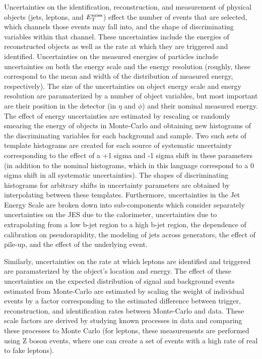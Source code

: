 Uncertainties on the identification, reconstruction, and measurement of physical objects (jets, leptons, and $E_{\mathrm{T}}^{\mathrm{miss}}$) effect the number of events that are selected, which channels those events may fall into, and the shape of discriminating variables within that channel.
These uncertainties include the energies of reconstructed objects as well as the rate at which they are triggered and identified.
Uncertainties on the measured energies of particles include uncertainties on both the energy scale and the energy resolution (roughly, these correspond to the mean and width of the distribution of measured energy, respectively).
The size of the uncertainties on object energy scale and energy resolution are paramaterized by a number of object variables, but most important are their position in the detector (in $\eta$ and $\phi$) and their nominal measured energy.
The effect of energy uncertainties are estimated by rescaling or randomly smearing the energy of objects in Monte-Carlo and obtaining new histograms of the discriminating variables for each background and sample.
Two such sets of template histograms are created for each source of systematic uncertainty corresponding to the effect of a +1 sigma and -1 sigma shift in these parameters (in addition to the nominal histograms, which in this language correspond to a 0 sigma shift in all systematic uncertainties).
The shapes of discriminating histograms for arbitrary shifts in uncertainty parameters are obtained by interpolating between these templates.
Furthermore, uncertainties in the Jet Energy Scale are broken down into sub-components which consider separately uncertainties on the JES due to the calorimeter, uncertainties due to extrapolating from a low b-jet region to a high b-jet region, the dependence of calibration on pseudorapidity, the modeling of jets across generators, the effect of pile-up, and the effect of the underlying event.

Similarly, uncertainties on the rate at which leptons are identified and triggered are paramaterized by the object's location and energy.
The effect of these uncertainties on the expected distribution of signal and background events estimated from Monte-Carlo are estimated by scaling the weight of individual events by a factor corresponding to the estimated difference between trigger, reconstruction, and identification rates between Monte-Carlo and data.
These scale factors are derived by studying known processes in data and comparing these processes to Monte Carlo (for leptons, these measurements are performed using Z boson events, where one can create a set of events with a high rate of real to fake leptons).

